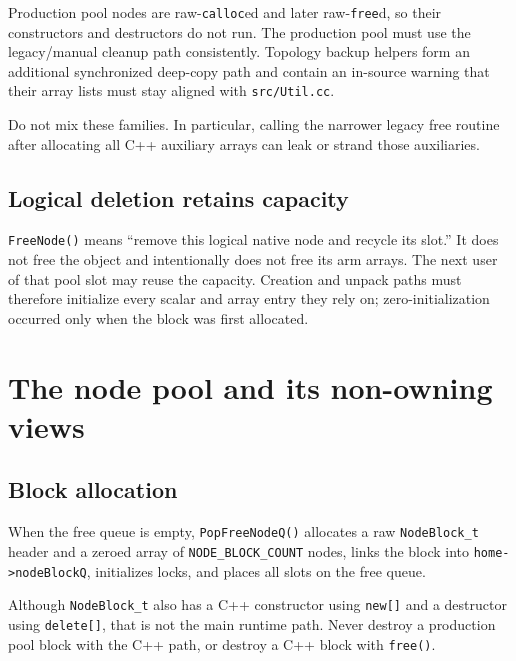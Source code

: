 \documentclass[11pt]{article}
\newcommand{\code}[1]{\texorpdfstring{\nolinkurl{#1}}{#1}}
\newcommand{\srcfile}[1]{\texorpdfstring{\nolinkurl{#1}}{#1}}
\begin{document}
Production pool nodes are raw-\code{calloc}ed and later raw-\code{free}d, so
their constructors and destructors do not run.  The production pool must use
the legacy/manual cleanup path consistently.  Topology backup helpers form an
additional synchronized deep-copy path and contain an in-source warning that
their array lists must stay aligned with \srcfile{src/Util.cc}.

Do not mix these families.  In particular, calling the narrower legacy free
routine after allocating all C++ auxiliary arrays can leak or strand those
auxiliaries.

\subsection{Logical deletion retains capacity}



\code{FreeNode()} means ``remove this logical native node and recycle its
slot.''  It does not free the object and intentionally does not free its arm
arrays.  The next user of that pool slot may reuse the capacity.  Creation and
unpack paths must therefore initialize every scalar and array entry they rely
on; zero-initialization occurred only when the block was first allocated.

\section{The node pool and its non-owning views}

\subsection{Block allocation}

When the free queue is empty, \code{PopFreeNodeQ()} allocates a raw
\code{NodeBlock_t} header and a zeroed array of
\code{NODE_BLOCK_COUNT} nodes, links the block into
\code{home->nodeBlockQ}, initializes locks, and places all slots on the free
queue.



Although \code{NodeBlock_t} also has a C++ constructor using \code{new[]}
and a destructor using \code{delete[]}, that is not the main runtime path.
Never destroy a production pool block with the C++ path, or destroy a C++
block with \code{free()}.
\end{document}
